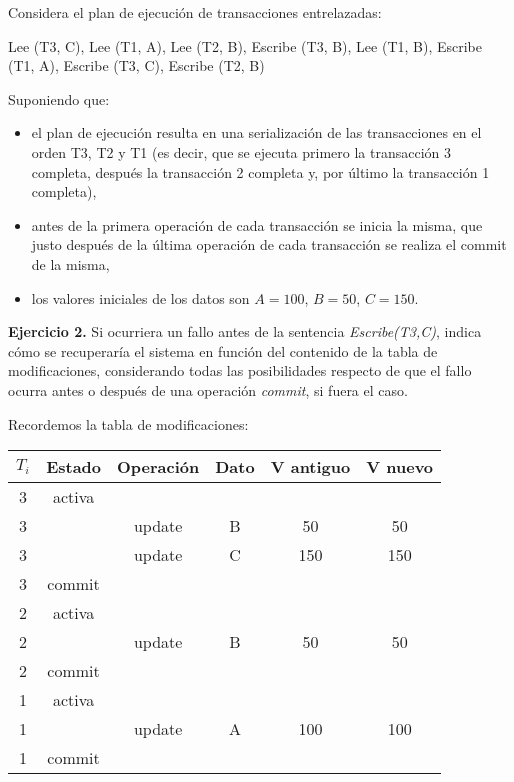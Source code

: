 \documentclass[12pt]{report}
\begin{document}
Considera el plan de ejecución de transacciones entrelazadas:

Lee (T3, C), Lee (T1, A), Lee (T2, B), Escribe (T3, B),
Lee (T1, B), Escribe (T1, A), Escribe (T3, C), Escribe (T2, B)

Suponiendo que:
\begin{itemize}
\item el plan de ejecución resulta en una serialización de las transacciones en el orden T3, T2 y T1
(es decir, que se ejecuta primero la transacción 3 completa, después la transacción 2
completa y, por último la transacción 1 completa), 
\item antes de la primera operación de cada transacción se inicia la misma, que justo después de la última operación de cada transacción se realiza el commit de la misma, 
\item los valores iniciales de los datos son $A=100$, $B=50$, $C=150$.
\end{itemize}

\textbf{Ejercicio 2.} Si ocurriera un fallo antes de la sentencia \textit{Escribe(T3,C)}, indica cómo se recuperaría el sistema en función del contenido de la tabla de modificaciones, considerando todas las posibilidades respecto de que el fallo ocurra antes o después de una operación \textit{commit}, si fuera el caso.

Recordemos la tabla de modificaciones:
\begin{center}
\begin{tabular}{|c|c|c|c|c|c|}
\hline 
$T_i$ & Estado & Operación & Dato & V antiguo & V nuevo \\ 
\hline 
3 & activa &   &   &   &   \\ 
\hline 
3 &   & update & B & 50 & 50 \\ 
\hline 
3 &   & update & C & 150 & 150 \\ 
\hline 
3 & commit &   &   &   &   \\ 
\hline 
2 & activa &   &   &   &   \\ 
\hline 
2 &   & update & B & 50 & 50 \\ 
\hline 
2 & commit &   &   &   &   \\ 
\hline 
1 & activa &   &   &   &   \\ 
\hline 
1 &   & update & A & 100 & 100 \\ 
\hline 
1 & commit &  &  &  &  \\ 
\hline 
\end{tabular} 
\end{center}
\end{document}
